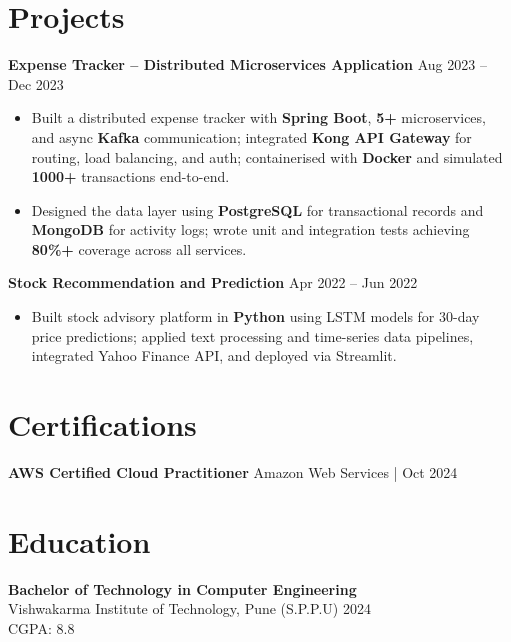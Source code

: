 \documentclass[a4paper,10pt]{article}
\begin{document}
\section*{Projects}

\textbf{Expense Tracker -- Distributed Microservices Application} \hfill Aug 2023 -- Dec 2023
\begin{itemize}[leftmargin=*]
    \item Built a distributed expense tracker with \textbf{Spring Boot}, \textbf{5+} microservices, and async \textbf{Kafka} communication; integrated \textbf{Kong API Gateway} for routing, load balancing, and auth; containerised with \textbf{Docker} and simulated \textbf{1000+} transactions end-to-end.
    \item Designed the data layer using \textbf{PostgreSQL} for transactional records and \textbf{MongoDB} for activity logs; wrote unit and integration tests achieving \textbf{80\%+} coverage across all services.
\end{itemize}
\textbf{Stock Recommendation and Prediction} \hfill Apr 2022 -- Jun 2022
\begin{itemize}[leftmargin=*]
    \item Built stock advisory platform in \textbf{Python} using LSTM models for 30-day price predictions; applied text processing and time-series data pipelines, integrated Yahoo Finance API, and deployed via Streamlit.
\end{itemize}

\section*{Certifications}
\textbf{AWS Certified Cloud Practitioner} \hfill Amazon Web Services \;|\; Oct 2024 \\

\section*{Education}

\textbf{Bachelor of Technology in Computer Engineering} \\
Vishwakarma Institute of Technology, Pune (S.P.P.U) \hfill 2024 \\
CGPA: 8.8
\end{document}
